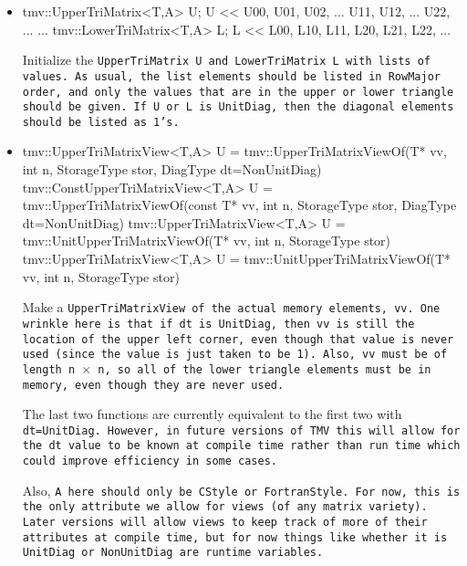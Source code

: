 \begin{itemize}
\item
\begin{tmvcode}
tmv::UpperTriMatrix<T,A> U;
U << U00, U01, U02, ...
          U11, U12, ...
               U22, ...
                    ...
tmv::LowerTriMatrix<T,A> L;
L << L00,
     L10, L11, 
     L20, L21, L22,
     ...
\end{tmvcode}
Initialize the \tt{UpperTriMatrix U} and \tt{LowerTriMatrix L} with lists of values.  As usual, the 
list elements should be listed in RowMajor order, and only the values that are in the upper or
lower triangle should be given.  If \tt{U} or \tt{L} is \tt{UnitDiag}, then the diagonal elements should be 
listed as 1's.
\item
\begin{tmvcode}
tmv::UpperTriMatrixView<T,A> U = 
      tmv::UpperTriMatrixViewOf(T* vv, int n, StorageType stor, 
      DiagType dt=NonUnitDiag)
tmv::ConstUpperTriMatrixView<T,A> U = 
      tmv::UpperTriMatrixViewOf(const T* vv, int n, StorageType stor, 
      DiagType dt=NonUnitDiag)
tmv::UpperTriMatrixView<T,A> U = 
      tmv::UnitUpperTriMatrixViewOf(T* vv, int n, StorageType stor)
tmv::UpperTriMatrixView<T,A> U = 
      tmv::UnitUpperTriMatrixViewOf(T* vv, int n, StorageType stor)
\end{tmvcode}
Make a \tt{UpperTriMatrixView} of the actual memory elements, \tt{vv}.
One wrinkle here is that if \tt{dt} is \tt{UnitDiag}, then 
\tt{vv} is still the location of the
upper left corner, even though that value is never used 
(since the value is just taken to
be 1).  Also, \tt{vv} must be of length \tt{n} $\times$ \tt{n},
so all of the lower triangle
elements must be in memory, even though they are never used.

The last two functions are currently equivalent to the first two with \tt{dt=UnitDiag}.
However, in future versions of TMV this will allow for the \tt{dt} value to be 
known at compile time rather than run time which could improve efficiency
in some cases.

Also, \tt{A} here should only be \tt{CStyle} or \tt{FortranStyle}.  For now, this is the only attribute we allow for views (of any matrix variety).  Later versions will allow views to keep track of more of their attributes at compile time, but for now things like whether it is \tt{UnitDiag} or \tt{NonUnitDiag} are runtime variables.


\end{itemize}
